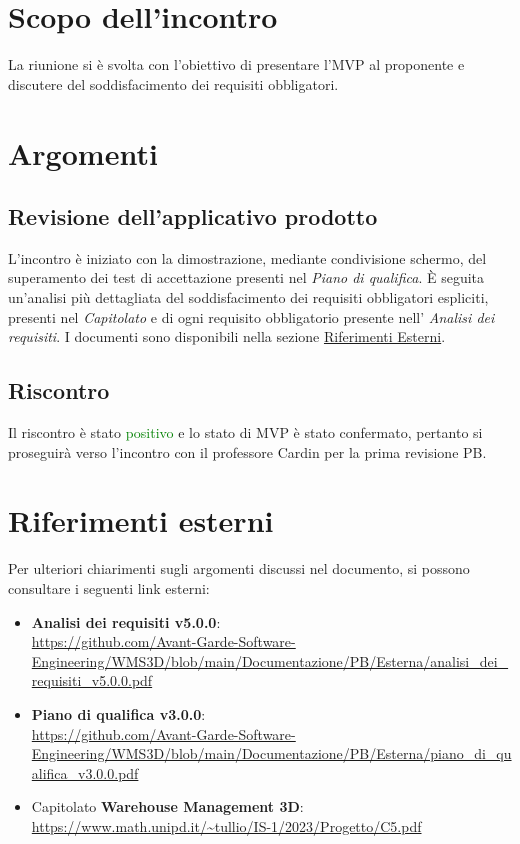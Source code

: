 \section{Scopo dell'incontro} \label{sec:scopo}
La riunione si è svolta con l'obiettivo di presentare l'MVP al proponente e discutere del soddisfacimento dei requisiti obbligatori.

\section{Argomenti} \label{sec:argomenti}
\subsection{Revisione dell'applicativo prodotto}
L'incontro è iniziato con la dimostrazione, mediante condivisione schermo, del superamento dei test di accettazione presenti nel \textit{Piano di qualifica}.
È seguita un'analisi più dettagliata del soddisfacimento dei requisiti obbligatori espliciti, presenti nel \textit{Capitolato} e di ogni requisito obbligatorio presente nell' \textit{Analisi dei requisiti}. I documenti sono disponibili nella sezione \hyperref[sec:riferimenti_esterni]{Riferimenti Esterni}.
\subsection{Riscontro}
Il riscontro è stato \textcolor{green}{positivo} e lo stato di MVP è stato confermato, pertanto si proseguirà verso l'incontro con il professore Cardin per la prima revisione PB.

\newpage
\section{Riferimenti esterni} \label{sec:riferimenti_esterni}
Per ulteriori chiarimenti sugli argomenti discussi nel documento, si possono consultare i seguenti link esterni:
\begin{itemize}
    \item \textbf{Analisi dei requisiti v5.0.0}:\\
    \url{https://github.com/Avant-Garde-Software-Engineering/WMS3D/blob/main/Documentazione/PB/Esterna/analisi_dei_requisiti_v5.0.0.pdf}
    \item \textbf{Piano di qualifica v3.0.0}:\\
    \url{https://github.com/Avant-Garde-Software-Engineering/WMS3D/blob/main/Documentazione/PB/Esterna/piano_di_qualifica_v3.0.0.pdf}
    \item Capitolato \textbf{Warehouse Management 3D}:\\
    \url{https://www.math.unipd.it/~tullio/IS-1/2023/Progetto/C5.pdf}
\end{itemize}